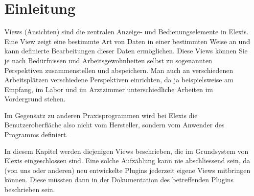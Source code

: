 %

\section{Einleitung}
Views (Ansichten) sind die zentralen Anzeige- und Bedienungselemente in Elexis.
Eine View zeigt eine bestimmte Art von Daten in einer bestimmten Weise an und
kann definierte Bearbeitungen dieser Daten ermöglichen. Diese Views können Sie
je nach Bedürfnissen und Arbeitsgewohnheiten selbst zu sogenannten Perspektiven
zusammenstellen und abspeichern. Man auch an verschiedenen Arbeitsplätzen
verschiedene Perspektiven einrichten, da ja beispielsweise am Empfang, im Labor
und im Arztzimmer unterschiedliche Arbeiten im Vordergrund stehen.

Im Gegensatz zu anderen Praxisprogrammen wird bei Elexis die Benutzeroberfläche
also nicht vom Hersteller, sondern vom Anwender des Programms definiert.

In diesem Kapitel werden diejenigen Views beschrieben, die im Grundsystem von
Elexis eingeschlossen sind. Eine solche Aufzählung kann nie abschliessend sein,
da (von uns oder anderen) neu entwickelte Plugins jederzeit eigene Views
mitbringen können. Diese müssten dann in der Dokumentation des betreffenden
Plugins beschrieben sein.

